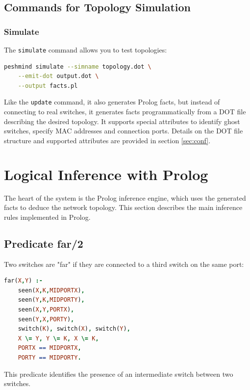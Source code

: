\documentclass[12pt,a4paper]{article}
\begin{document}
\subsection{Commands for Topology Simulation}

\subsubsection{Simulate}

The \texttt{simulate} command allows you to test topologies:

\begin{lstlisting}[language=bash]
peshmind simulate --simname topology.dot \
    --emit-dot output.dot \
    --output facts.pl
\end{lstlisting}

Like the \texttt{update} command, it also generates Prolog facts, but instead of connecting to real switches,
it generates facts programmatically from a DOT file describing the desired topology. It supports
special attributes to identify ghost switches, specify MAC addresses and connection ports. Details on the
DOT file structure and supported attributes are provided in section \ref{sec:conf}.

\section{Logical Inference with Prolog}
\label{sec:inference}

The heart of the system is the Prolog inference engine, which uses the generated facts to deduce the network topology.
This section describes the main inference rules implemented in Prolog.

\subsection{Predicate far/2}

Two switches are "far" if they are connected to a third switch on the same port:

\begin{lstlisting}[language=Prolog]
far(X,Y) :- 
    seen(X,K,MIDPORTX), 
    seen(Y,K,MIDPORTY),
    seen(X,Y,PORTX),
    seen(Y,X,PORTY),
    switch(K), switch(X), switch(Y), 
    X \= Y, Y \= K, X \= K, 
    PORTX == MIDPORTX,
    PORTY == MIDPORTY.
\end{lstlisting}

This predicate identifies the presence of an intermediate switch between two switches.
\end{document}
